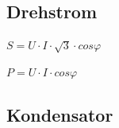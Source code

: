 \documentclass[12pt,a4paper]{article}
\begin{document}
\subsection{Drehstrom}
\begin{description}
\item $S = U \cdot I \cdot \sqrt{3} \cdot cos \varphi$
\item $P = U \cdot I \cdot cos \varphi$
\end{description}
\subsection{Kondensator}
\end{document}
